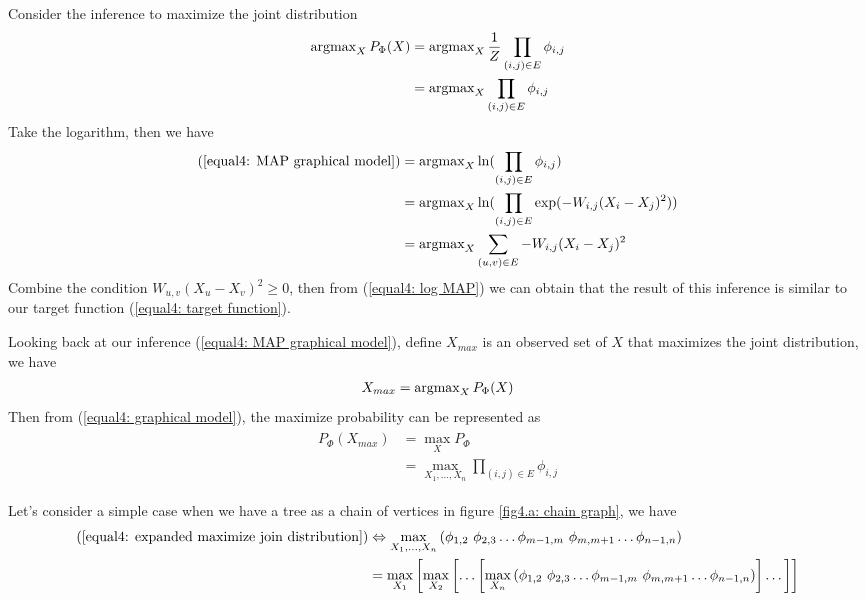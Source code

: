 Consider the inference to maximize the joint distribution
\begin{align}
	\begin{split}
	\operatorname{argmax}_X{P_\Phi}(X) & = \operatorname{argmax}_X{\frac{1}{Z} \prod_{(i,j) \in E}{\phi_{i,j}}} \\
	& =  \operatorname{argmax}_X{\prod_{(i,j) \in E}{\phi_{i,j}}}
	\end{split}
	\label{equal4: MAP graphical model}
\end{align}
Take the logarithm, then we have
\begin{align}
	\begin{split}
	(\ref{equal4: MAP graphical model}) &= \operatorname{argmax}_X{\ln(\prod_{(i,j) \in E}{\phi_{i,j}})} \\
	&= \operatorname{argmax}_X{\ln(\prod_{(i,j) \in E}{ \exp(-W_{i,j}(X_i - X_j)^2) })} \\
	&= \operatorname{argmax}_X{\sum_{(u,v) \in E}{ -W_{i,j}(X_i - X_j)^2 }}
	\end{split}
	\label{equal4: log MAP}
\end{align}
Combine the condition $W_{u,v}(X_u - X_v)^2 \geq 0$, then from (\ref{equal4: log MAP}) we can obtain that the result of this inference is similar to our target function (\ref{equal4: target function}).

Looking back at our inference (\ref{equal4: MAP graphical model}), define $X_{max}$ is an observed set of $X$ that maximizes the joint distribution, we have
\begin{align}
	X_{max} = \operatorname{argmax}_X{P_\Phi}(X)
\end{align}
Then from (\ref{equal4: graphical model}), the maximize probability can be represented as
\begin{align}
	\begin{split}
	P_\Phi(X_{max}) &= \max_X{P_\Phi}\\
	&= \max_{X_1, ..., X_n}{\prod_{(i,j) \in E}{\phi_{i,j}}}
	\end{split}
	\label{equal4: expanded maximize join distribution}
\end{align}

Let's consider a simple case when we have a tree as a chain of vertices in figure \ref{fig4.a: chain graph}, we have
\begin{align}
		(\ref{equal4: expanded maximize join distribution}) &\Leftrightarrow 
		\max_{X_1, ..., X_n}{\left( \phi_{1,2} \ \phi_{2,3} \dots \phi_{m-1,m} \ \phi_{m,m+1} \dots \phi_{n-1,n} \right)}\\
		& = \max_{X_1} \left[ \max_{X_2} \left[ \dots \left[ 
			\max_{X_n}{ \left( \phi_{1,2} \ \phi_{2,3} \dots \phi_{m-1,m} \ \phi_{m,m+1} \dots \phi_{n-1,n} \right) }
		\right] \dots \right] \right]
		\label{equal4: chain tree: inference equation}
\end{align}

